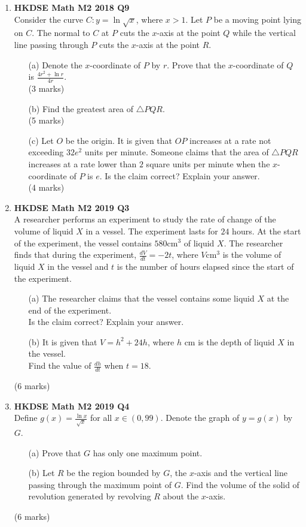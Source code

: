 \documentclass{report}
\begin{document}
\begin{enumerate}
	\item \textbf{HKDSE Math M2 2018 Q9}\\
	Consider the curve $C : y = \displaystyle\ln \sqrt{x}$, where $x > 1$. Let $P$ be a moving point lying on $C$. The normal to $C$ at $P$ cuts the $x$-axis at the point $Q$ while the vertical line passing through $P$ cuts the $x$-axis at the point $R$.  
	\begin{enumerate}
		\item [(a)]Denote the $x$-coordinate of $P$ by $r$. Prove that the $x$-coordinate of $Q$ is $\displaystyle\frac{4r^2+\ln r}{4r}$.  \\(3 marks)
		\item [(b)]Find the greatest area of $\triangle PQR$. \\(5 marks) 
		\item [(c)]Let $O$ be the origin. It is given that $OP$ increases at a rate not exceeding $32e^2$ units per minute. Someone claims that the area of $\triangle PQR$ increases at a rate lower than $2$ square units per minute when the $x$-coordinate of $P$ is $e$. Is the claim correct? Explain your answer. \\(4 marks) 
	\end{enumerate}

	\newpage

	\item \textbf{HKDSE Math M2 2019 Q3}\\
	A researcher performs an experiment to study the rate of change of the volume of liquid $X$ in a vessel. The experiment lasts for $24$ hours. At the start  of the experiment, the vessel contains $580 $cm$^3$ of liquid $X$. The researcher finds that during the experiment, $\displaystyle\frac{dV}{dt} = -2t$, where $V $cm$^3$ is the volume of liquid $X$ in the vessel and $t$ is the number of hours elapsed since the start of the experiment.
	\begin{enumerate}
		\item [(a)] The researcher claims that the vessel contains some liquid $X$ at the end of the experiment. \\
		Is the claim correct? Explain your answer.
		\item [(b)] It is given that $V = h^2+24h$, where $h $ cm is the depth of liquid $X$ in the vessel. \\
		Find the value of $\displaystyle\frac{dh}{dt}$ when $t = 18$.
	\end{enumerate}
	(6 marks)

	\item \textbf{HKDSE Math M2 2019 Q4}\\
	Define $\displaystyle g(x) = \frac{\ln{x}}{\sqrt{x}}$ for all $x \in (0,99)$. Denote the graph of $y = g(x) $ by $G$. 
	\begin{enumerate}
		\item [(a)]Prove that $G$ has only one maximum point. 
		\item [(b)]Let $R$ be the region bounded by $G$, the $x$-axis and the vertical line passing through the maximum point of $G$. Find the volume of the solid of revolution generated by revolving $R$ about the $x$-axis.
	\end{enumerate}
	(6 marks)


\end{enumerate}
\end{document}
